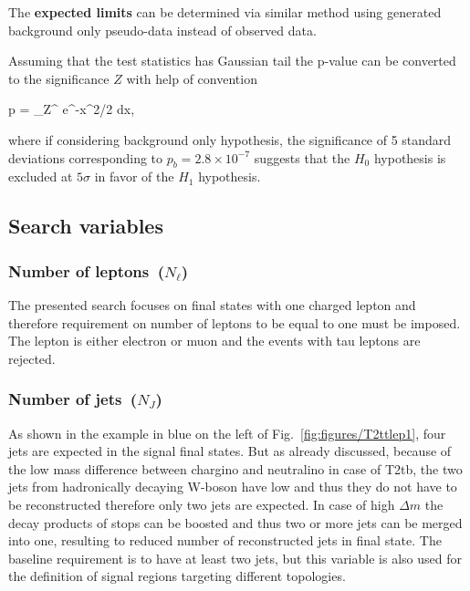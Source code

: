 The \textbf{expected limits} can be determined via similar method using generated background only pseudo-data instead of observed data. 

Assuming that the test statistics has Gaussian tail  the p-value can be converted to the significance $Z$ with help of convention

{
 p = \int_Z^{\infty}  e^{-x^{2}/2} dx,
}

where if considering background only hypothesis, the significance of 5 standard deviations corresponding to $p_{b} = 2.8 \times 10^{-7} $ suggests that the $H_{0}$ hypothesis is excluded at $5 \sigma$ in favor of the $H_{1}$ hypothesis. %

\subsection{Search variables~\label{sec:variables}}

\subsubsection{Number of leptons~($N_{\ell}$)}

The presented search focuses on final states with one charged lepton and therefore requirement on number of leptons to be equal to one must be imposed. The lepton is either electron or muon and the events with tau leptons are rejected.

\subsubsection{Number of jets~($N_{J}$)}

As shown in the example in blue on the left of Fig.~\ref{fig:figures/T2ttlep1}, four jets are expected in the signal final states. But as already discussed, because of the low mass difference between chargino and neutralino in case of T2tb, the two jets from hadronically decaying W-boson have low \pt and thus they do not have to be reconstructed therefore only two jets are expected. In case of high $\Delta m$ the decay products of stops can be boosted and thus two or more jets can be merged into one, resulting to reduced number of reconstructed jets in final state. The baseline requirement is to have at least two jets, but this variable is also used for the definition of signal regions targeting different topologies.


